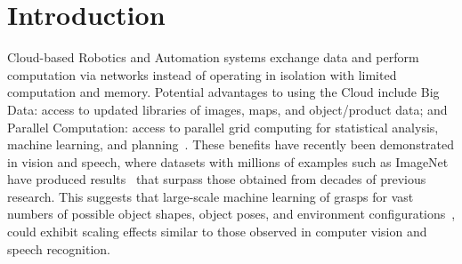 \section{Introduction}

Cloud-based Robotics and Automation systems exchange data and perform computation via networks instead of operating in isolation with limited computation and memory.
Potential advantages to using the Cloud include Big Data: access to updated libraries of images, maps, and object/product data; and Parallel Computation: access to parallel grid computing for statistical analysis, machine learning, and planning~\cite{kehoe2015survey}.
These benefits have recently been demonstrated in vision and speech, where datasets with millions of examples such as ImageNet have produced results~\cite{hannun2014deepspeech, krizhevsky2012imagenet} that surpass those obtained from decades of previous research.
This suggests that large-scale machine learning of grasps for vast numbers of possible object shapes, object poses, and environment configurations~\cite{goldfeder2011data, lenz2015deep, kappler2015leveraging}, could exhibit scaling effects similar to those observed in computer vision and speech recognition.

